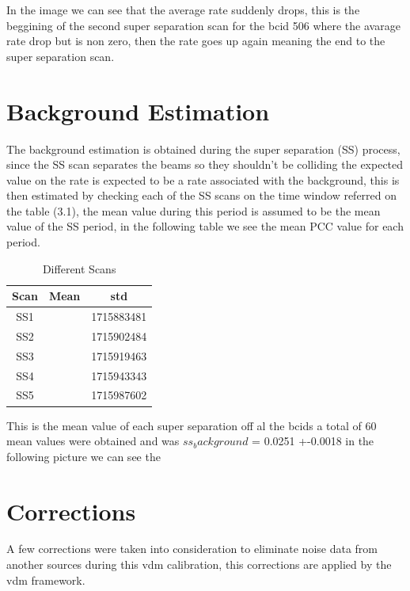 In the image we can see that the average rate suddenly drops, this is the beggining of the second super separation scan for the bcid 506 where the avarage rate drop but is non zero, then the rate goes up again meaning the end to the super separation scan.  

\section{Background Estimation}

The background estimation is obtained during the super separation (SS) process, since the SS scan separates the beams so they shouldn't be colliding the expected value on the rate is expected to be a rate associated with the background, this is then estimated by checking each of the SS scans on the time window referred on the table (3.1), the mean value during this period is assumed to be the mean value of the SS period, in the following table we see the mean PCC value for each period.  

\begin{table} [H]
\begin{center}
\caption{Different Scans}
\begin{tabular}{|c c c|} 
 \hline
 Scan & Mean & std  \\ [0.5ex] 
 \hline\hline
 SS1 &  & 1715883481  \\ 
 \hline
 SS2 &  & 1715902484  \\
 \hline
 SS3 &  & 1715919463 \\
 \hline
 SS4 &  & 1715943343  \\
 \hline
 SS5 &  & 1715987602  \\ [1.0ex]
 \hline
\end{tabular}
\end{center}
\end{table}

This is the mean value of each super separation off al the bcids a total of 60 mean values were obtained and was $ss_background$ = 0.0251 +-0.0018 in the following picture we can see the 



\section{Corrections}

A few corrections were taken into consideration to eliminate noise data from another sources during this vdm calibration, this corrections are applied by the vdm framework. 

